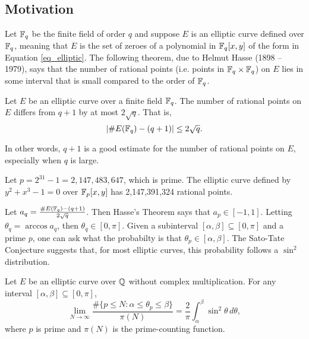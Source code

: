 
\subsection{Motivation}

Let $\mathbb{F}_q$ be the finite field of order $q$ and suppose $E$ is an elliptic curve defined over $\mathbb{F}_q$,
meaning that $E$ is the set of zeroes of a polynomial in $\mathbb{F}_q[x,y]$ of the form in Equation \ref{eq_elliptic}.
The following theorem, due to Helmut Hasse (1898 -- 1979), says that
the number of rational points (i.e. points in $\mathbb{F}_q \times \mathbb{F}_q$) on $E$
lies in some interval that is small compared to the order of $\mathbb{F}_q$.
\begin{theorem}[Hasse]
  Let $E$ be an elliptic curve over a finite field $\mathbb{F}_q$.
  The number of rational points on $E$ differs from $q + 1$ by at most $2 \sqrt q$. That is,
  \[ | \#E(\mathbb{F}_q) - (q + 1) | \leq 2 \sqrt q. \]
\end{theorem}
In other words,
$q + 1$ is a good estimate for the number of rational points on $E$,
especially when $q$ is large.

\begin{example}
  Let $p = 2^{31} - 1 = 2,147,483,647$, which is prime.
  The elliptic curve defined by $y^2 + x^3 - 1 = 0$ over $\mathbb{F}_p[x,y]$ has 2,147,391,324 rational points.
\end{example}

Let $a_q = \frac {\#E(\mathbb{F}_q) - (q + 1)} {2\sqrt q}$.
Then Hasse's Theorem says that $a_p \in [-1, 1]$.
Letting $\theta_q = \arccos a_q$, then $\theta_q \in [0, \pi]$.
Given a subinterval $[\alpha, \beta] \subseteq [0, \pi]$ and a prime $p$,
one can ask what the probabilty is that $\theta_p \in [\alpha, \beta]$.
The Sato-Tate Conjecture suggests that, for most elliptic curves, this probability follows a $\sin^2$ distribution.

\begin{conjecture}
  Let $E$ be an elliptic curve over $\mathbb{Q}$ without complex multiplication.
  For any interval $[\alpha, \beta] \subseteq [0, \pi]$,
  \[ \lim_{N \to \infty}
    \frac {\#\{ p \leq N : \alpha \leq \theta_p \leq \beta \}} {\pi(N)} =
    \frac 2 \pi \int_{\alpha}^{\beta} \sin^2 \theta\,d\theta, \]
  where $p$ is prime and $\pi(N)$ is the prime-counting function.
\end{conjecture}

